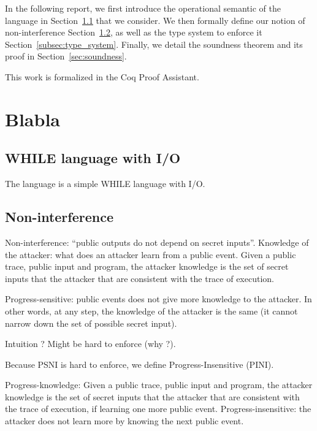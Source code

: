 \documentclass[10pt]{article}
\begin{document}
In the following report, we first introduce the operational semantic of the language in
Section~\ref{subsec:opsem} that we consider.
We then formally define our notion of non-interference Section~\ref{subsec:ni}, as well as the type
system to enforce it Section~\ref{subsec:type_system}.
Finally, we detail the soundness theorem and its proof in Section~\ref{sec:soundness}.

This work is formalized in the Coq Proof Assistant.

\section{Blabla}
\label{sec:bla}

\subsection{WHILE language with I/O}%
\label{subsec:opsem}

The language is a simple WHILE language with I/O.

\subsection{Non-interference}%
\label{subsec:ni}

Non-interference: ``public outputs do not depend on secret inputs''.
Knowledge of the attacker: what does an attacker learn from a public event.
Given a public trace, public input and program, the attacker knowledge is the set of secret inputs
that the attacker that are consistent with the trace of execution.

Progress-sensitive: public events does not give more knowledge to the attacker. In other words,
at any step, the knowledge of the attacker is the same (it cannot narrow down the set of possible
secret input).

Intuition ? Might be hard to enforce (why ?).

Because PSNI is hard to enforce, we define Progress-Insensitive (PINI).

Progress-knowledge:
Given a public trace, public input and program, the attacker knowledge is the set of secret inputs
that the attacker that are consistent with the trace of execution, if learning one more public
event.
Progress-insensitive: the attacker does not learn more by knowing the next public event.
\end{document}
